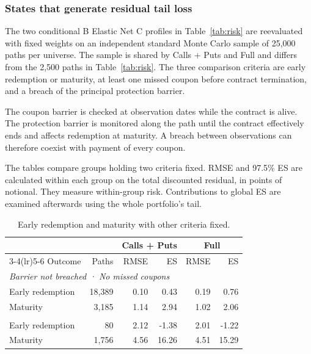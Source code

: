 \documentclass[12pt,a4paper]{article}
\newcommand{\1}{\mathbf{1}}
\begin{document}
\subsubsection*{States that generate residual tail loss}

The two conditional B Elastic Net C profiles in Table~\ref{tab:risk} are reevaluated with fixed weights on an independent standard Monte Carlo sample of 25,000 paths per universe. The sample is shared by Calls + Puts and Full and differs from the 2,500 paths in Table~\ref{tab:risk}. The three comparison criteria are early redemption or maturity, at least one missed coupon before contract termination, and a breach of the principal protection barrier.

The coupon barrier is checked at observation dates while the contract is alive. The protection barrier is monitored along the path until the contract effectively ends and affects redemption at maturity. A breach between observations can therefore coexist with payment of every coupon.

The tables compare groups holding two criteria fixed. RMSE and 97.5\% ES are calculated within each group on the total discounted residual, in points of notional. They measure within-group risk. Contributions to global ES are examined afterwards using the whole portfolio’s tail.

\begin{table}[H]
\centering
\small
\setlength{\tabcolsep}{4pt}
\begin{tabular}{lrrrrr}
\toprule
 & & \multicolumn{2}{c}{Calls + Puts} & \multicolumn{2}{c}{Full} \\
\cmidrule(lr){3-4}\cmidrule(lr){5-6}
Outcome & Paths & RMSE & ES & RMSE & ES \\
\midrule
\multicolumn{6}{l}{\textit{Barrier not breached · No missed coupons}} \\
\addlinespace[2pt]
Early redemption & 18,389 & 0.10 & 0.43 & 0.19 & 0.76 \\
Maturity & 3,185 & 1.14 & 2.94 & 1.02 & 2.06 \\
\addlinespace[4pt]
\multicolumn{6}{l}{\textit{Barrier not breached · Missed coupon}} \\
\addlinespace[2pt]
Early redemption & 80 & 2.12 & -1.38 & 2.01 & -1.22 \\
Maturity & 1,756 & 4.56 & 16.26 & 4.51 & 15.29 \\
\bottomrule
\end{tabular}

\caption{Early redemption and maturity with other criteria fixed.}
\label{tab:tail-contract-counts}
\end{table}
\end{document}
